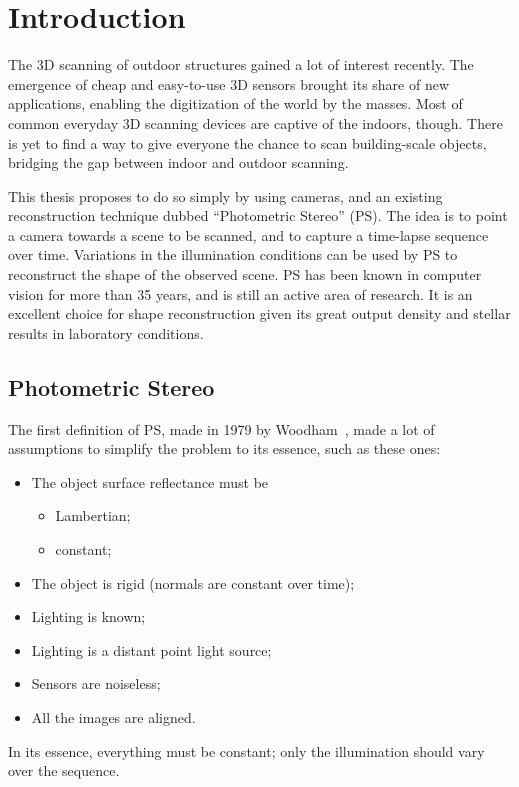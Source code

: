 
\chapter{Introduction}

The 3D scanning of outdoor structures gained a lot of interest recently. The emergence of cheap and easy-to-use 3D sensors brought its share of new applications, enabling the digitization of the world by the masses. Most of common everyday 3D scanning devices are captive of the indoors, though. There is yet to find a way to give everyone the chance to scan building-scale objects, bridging the gap between indoor and outdoor scanning.

This thesis proposes to do so simply by using cameras, and an existing reconstruction technique dubbed ``Photometric Stereo'' (PS). The idea is to point a camera towards a scene to be scanned, and to capture a time-lapse sequence over time. Variations in the illumination conditions can be used by PS to reconstruct the shape of the observed scene. PS has been known in computer vision for more than 35 years, and is still an active area of research. It is an excellent choice for shape reconstruction given its great output density and stellar results in laboratory conditions.

\section{Photometric Stereo}
\label{sec:ps_ori}

The first definition of PS, made in 1979 by Woodham~\cite{Woodham1979}, made a lot of assumptions to simplify the problem to its essence, such as these ones:

\begin{itemize} \setlength\itemsep{-0.2em}
  \item The object surface reflectance must be
  \vspace{-0.65em}\begin{itemize} \setlength\itemsep{0.1em}
    \item Lambertian;
    \item constant;
  \end{itemize} \vspace{-0.4em}
  \item The object is rigid (normals are constant over time);
  \item Lighting is known;
  \item Lighting is a distant point light source;
  \item Sensors are noiseless;
  \item All the images are aligned.
\end{itemize}
In its essence, everything must be constant; only the illumination should vary over the sequence.

